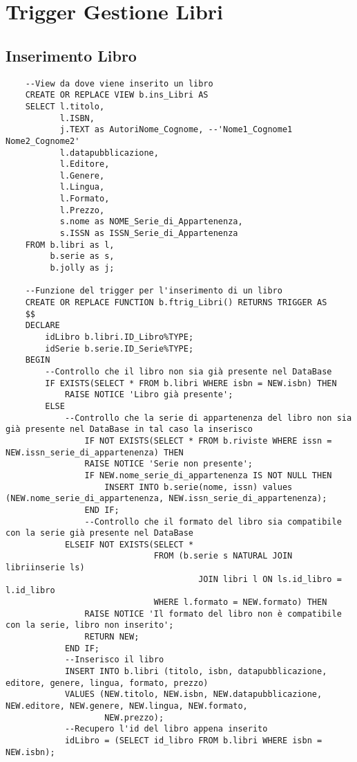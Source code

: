 \section{Trigger Gestione Libri}
\subsection{Inserimento Libro}
\begin{lstlisting}
    --View da dove viene inserito un libro
    CREATE OR REPLACE VIEW b.ins_Libri AS
    SELECT l.titolo,
           l.ISBN,
           j.TEXT as AutoriNome_Cognome, --'Nome1_Cognome1 Nome2_Cognome2'
           l.datapubblicazione,
           l.Editore,
           l.Genere,
           l.Lingua,
           l.Formato,
           l.Prezzo,
           s.nome as NOME_Serie_di_Appartenenza,
           s.ISSN as ISSN_Serie_di_Appartenenza
    FROM b.libri as l,
         b.serie as s,
         b.jolly as j;
    
    --Funzione del trigger per l'inserimento di un libro
    CREATE OR REPLACE FUNCTION b.ftrig_Libri() RETURNS TRIGGER AS
    $$
    DECLARE
        idLibro b.libri.ID_Libro%TYPE;
        idSerie b.serie.ID_Serie%TYPE;
    BEGIN
        --Controllo che il libro non sia già presente nel DataBase
        IF EXISTS(SELECT * FROM b.libri WHERE isbn = NEW.isbn) THEN
            RAISE NOTICE 'Libro già presente';
        ELSE
            --Controllo che la serie di appartenenza del libro non sia già presente nel DataBase in tal caso la inserisco
                IF NOT EXISTS(SELECT * FROM b.riviste WHERE issn = NEW.issn_serie_di_appartenenza) THEN
                RAISE NOTICE 'Serie non presente';
                IF NEW.nome_serie_di_appartenenza IS NOT NULL THEN
                    INSERT INTO b.serie(nome, issn) values (NEW.nome_serie_di_appartenenza, NEW.issn_serie_di_appartenenza);
                END IF;
                --Controllo che il formato del libro sia compatibile con la serie già presente nel DataBase
            ELSEIF NOT EXISTS(SELECT *
                              FROM (b.serie s NATURAL JOIN libriinserie ls)
                                       JOIN libri l ON ls.id_libro = l.id_libro
                              WHERE l.formato = NEW.formato) THEN
                RAISE NOTICE 'Il formato del libro non è compatibile con la serie, libro non inserito';
                RETURN NEW;
            END IF;
            --Inserisco il libro
            INSERT INTO b.libri (titolo, isbn, datapubblicazione, editore, genere, lingua, formato, prezzo)
            VALUES (NEW.titolo, NEW.isbn, NEW.datapubblicazione, NEW.editore, NEW.genere, NEW.lingua, NEW.formato,
                    NEW.prezzo);
            --Recupero l'id del libro appena inserito
            idLibro = (SELECT id_libro FROM b.libri WHERE isbn = NEW.isbn);
    

\end{lstlisting}
